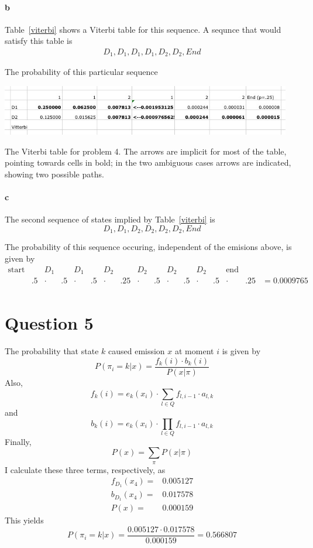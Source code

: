 \documentclass[12pt]{article}
\begin{document}
\paragraph{b} %

Table~\ref{viterbi} shows a Viterbi table for this sequence.  A sequnce that would satisfy this table is
\begin{align*}
	D_1, D_1, D_1, D_1, D_2, D_2, End
\end{align*}

The probability of this particular sequence 

\begin{table}[tb]
	\centering
	\includegraphics[width=5in]{./viterbi.jpg}
	\caption{The Viterbi table for problem 4.  The arrows are implicit for most of the table, pointing towards cells in bold; in the two ambiguous cases arrows are indicated, showing two possible paths.}
	\label{viterbi}
\end{table}



\paragraph{c} 
The second sequence of states implied by Table~\ref{viterbi} is
\[
	D_1, D_1, D_2, D_2, D_2, D_2, End
\]

The probability of this sequence occuring, independent of the emisions above, is given by
$$\begin{array}{cccccccccccccccccccc}
	\text{start}& &D_1& &D_1& &D_2& &D_2& &D_2& &D_2& &\text{end}&\\
	&.5&\cdot&.5&\cdot&.5&\cdot&.25&\cdot&.5&\cdot&.5&\cdot&.5&\cdot&.25&= 0.0009765\\
\end{array}$$
\section*{Question 5}
The probability that state $k$ caused emission $x$ at moment $i$ is given by
\[
	 P(\pi_i = k|x) = \frac{f_{k}(i) \cdot b_k(i)}{P(x|\pi)}
\]
Also,
\[
	f_{k}(i) = e_k(x_i)\cdot \sum_{l\in Q} f_{l,i-1}\cdot a_{l,k} 
\]
and
\[
	b_{k}(i) = e_k(x_i)\cdot \prod_{l\in Q} f_{l,i-1}\cdot a_{l,k}
\]
Finally,
\[
	P(x)=\sum_\pi P(x|\pi)
\]
I calculate these three terms, respectively, as
\begin{align*}
	f_{D_1}(x_4)=& 0.005127 \\
	b_{D_1}(x_4)=& 0.017578\\
	P(x) =& 0.000159
\end{align*}
This yields  %
\[
	P(\pi_i = k|x) = \frac{0.005127 \cdot 0.017578}{0.000159} = 0.566807
\]
\end{document}
